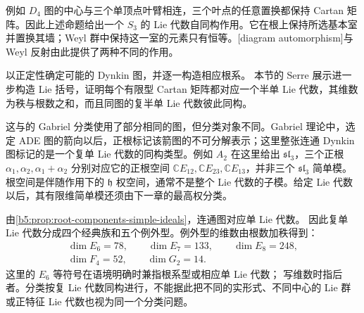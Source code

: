 例如 \(D_4\) 图的中心与三个单顶点叶臂相连，三个叶点的任意置换都保持 Cartan 矩阵。因此上述命题给出一个 \(S_3\) 的 Lie 代数自同构作用。它在根上保持所选基本室并置换其墙；Weyl 群中保持这一室的元素只有恒等。[diagram automorphism]与 Weyl 反射由此提供了两种不同的作用。

\ProseParagraphBreak

以正定性确定可能的 Dynkin 图，并逐一构造相应根系。 本节的 Serre 展示进一步构造 Lie 括号，证明每个有限型 Cartan 矩阵都对应一个半单 Lie 代数，其维数为秩与根数之和，而且同图的复半单 Lie 代数彼此同构。

\ProseParagraphBreak

这与的 Gabriel 分类使用了部分相同的图，但分类对象不同。Gabriel 理论中，选定 ADE 图的箭向以后，正根标记该箭图的不可分解表示；这里整张连通 Dynkin 图标记的是一个复单 Lie 代数的同构类型。例如 \(A_2\) 在这里给出 \(\mathfrak{sl}_3\)，三个正根 \(\alpha_1,\alpha_2,\alpha_1+\alpha_2\) 分别对应它的正根空间 \(\mathbb CE_{12},\mathbb CE_{23},\mathbb CE_{13}\)，并非三个 \(\mathfrak{sl}_3\) 简单模。根空间是伴随作用下的 \(\mathfrak h\) 权空间，通常不是整个 Lie 代数的子模。给定 Lie 代数以后，其有限维简单模还须由下一章的最高权分类。

\ProseParagraphBreak

由\cref{b5:prop:root-components-simple-ideals}，连通图对应单 Lie 代数。 因此复单 Lie 代数分成四个经典族和五个例外型。例外型的维数由根数加秩得到：
\[
	\begin{gathered}
		\dim E_6=78,\qquad \dim E_7=133,\qquad \dim E_8=248,\\
		\dim F_4=52,\qquad \dim G_2=14.
	\end{gathered}
\]
这里的 \(E_6\) 等符号在语境明确时兼指根系型或相应单 Lie 代数； 写维数时指后者。分类按复 Lie 代数同构进行，不能据此把不同的实形式、不同中心的 Lie 群或正特征 Lie 代数也视为同一个分类问题。
